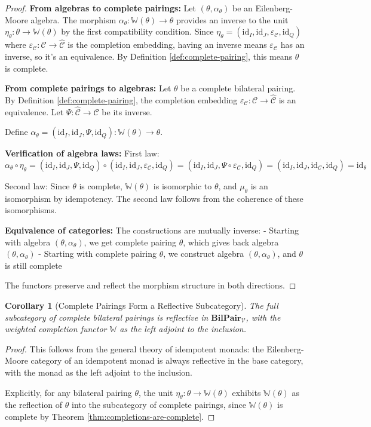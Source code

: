 \documentclass[11pt]{article}
\theoremstyle{plain}
\newtheorem{corollary}[theorem]{Corollary}
\theoremstyle{definition}
\theoremstyle{remark}
\newcommand{\V}{\mathcal{V}}
\newcommand{\C}{\mathcal{C}}
\newcommand{\id}{\mathrm{id}}
\newcommand{\wh}[1]{\widehat{#1}}
\begin{document}
\begin{proof}
\textbf{From algebras to complete pairings:}
Let $(\theta, \alpha_\theta)$ be an Eilenberg-Moore algebra. The morphism $\alpha_\theta : \mathbb{W}(\theta) \to \theta$ provides an inverse to the unit $\eta_\theta : \theta \to \mathbb{W}(\theta)$ by the first compatibility condition. Since $\eta_\theta = (\id_I, \id_J, \varepsilon_\C, \id_Q)$ where $\varepsilon_\C : \C \to \wh{\C}$ is the completion embedding, having an inverse means $\varepsilon_\C$ has an inverse, so it's an equivalence. By Definition \ref{def:complete-pairing}, this means $\theta$ is complete.

\textbf{From complete pairings to algebras:}
Let $\theta$ be a complete bilateral pairing. By Definition \ref{def:complete-pairing}, the completion embedding $\varepsilon_\C : \C \to \wh{\C}$ is an equivalence. Let $\Psi : \wh{\C} \to \C$ be its inverse.

Define $\alpha_\theta = (\id_I, \id_J, \Psi, \id_Q) : \mathbb{W}(\theta) \to \theta$.

\textbf{Verification of algebra laws:}
First law: $\alpha_\theta \circ \eta_\theta = (\id_I, \id_J, \Psi, \id_Q) \circ (\id_I, \id_J, \varepsilon_\C, \id_Q) = (\id_I, \id_J, \Psi \circ \varepsilon_\C, \id_Q) = (\id_I, \id_J, \id_\C, \id_Q) = \id_\theta$ 

Second law: Since $\theta$ is complete, $\mathbb{W}(\theta)$ is isomorphic to $\theta$, and $\mu_\theta$ is an isomorphism by idempotency. The second law follows from the coherence of these isomorphisms.

\textbf{Equivalence of categories:}
The constructions are mutually inverse:
- Starting with algebra $(\theta, \alpha_\theta)$, we get complete pairing $\theta$, which gives back algebra $(\theta, \alpha_\theta)$
- Starting with complete pairing $\theta$, we construct algebra $(\theta, \alpha_\theta)$, and $\theta$ is still complete

The functors preserve and reflect the morphism structure in both directions.
\end{proof}

\begin{corollary}[Complete Pairings Form a Reflective Subcategory]\label{cor:reflective-subcategory}
The full subcategory of complete bilateral pairings is reflective in $\mathbf{BilPair}_\V$, with the weighted completion functor $\mathbb{W}$ as the left adjoint to the inclusion.
\end{corollary}

\begin{proof}
This follows from the general theory of idempotent monads: the Eilenberg-Moore category of an idempotent monad is always reflective in the base category, with the monad as the left adjoint to the inclusion.

Explicitly, for any bilateral pairing $\theta$, the unit $\eta_\theta : \theta \to \mathbb{W}(\theta)$ exhibits $\mathbb{W}(\theta)$ as the reflection of $\theta$ into the subcategory of complete pairings, since $\mathbb{W}(\theta)$ is complete by Theorem \ref{thm:completions-are-complete}.
\end{proof}
\end{document}
